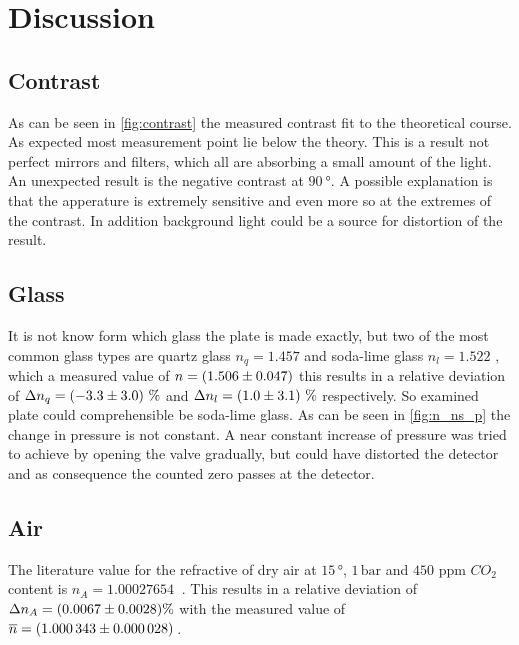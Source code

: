 \section{Discussion}
\label{sec:Diskussion}

\subsection{Contrast}

As can be seen in \autoref{fig:contrast} the measured contrast fit to the theoretical course.
As expected most measurement point lie below the theory. 
This is a result not perfect mirrors and filters, which all are absorbing a small amount of the light.
An unexpected result is the negative contrast at $\SI{90}{\degree}$.
A possible explanation is that the apperature is extremely sensitive and even more so at the extremes of the contrast.
In addition background light could be a source for distortion of the result.

\subsection{Glass}

It is not know form which glass the plate is made exactly, but two of the most common glass types are quartz glass $n_{q} = 1.457$\cite{Malitson:65} and soda-lime glass $n_{l} = 1.522$ \cite{RUBIN1985275},
which a measured value of $n = \SI{1.506 \pm 0.047}{}$ this results in a relative deviation of $\Delta n_q = \SI{-3.3 \pm 3.0} \,\%$ and
$\Delta n_l = \SI{1.0 \pm 3.1}\,\%$ respectively. 
So examined plate could comprehensible be soda-lime glass.
As can be seen in \autoref{fig:n_ns_p} the change in pressure is not constant. 
A near constant increase of pressure was tried to achieve by opening the valve gradually, but could have distorted the detector and as consequence the counted zero passes at the detector.

\subsection{Air}

The literature value for the refractive of dry air at $15\, \unit{\degree}$, $1\, \unit{\bar}$ and $450$ ppm $CO_{2}$ content is $n_{A} = \SI{1.00027654}{}$ \cite{Ciddor:96}.
This results in a relative deviation of  $\Delta n_{A} = \SI{0.0067 \pm 0.0028}{} \%$ with the measured value of $\overline{n} = \SI{1.000343 \pm 0.000028}{}\,$. 